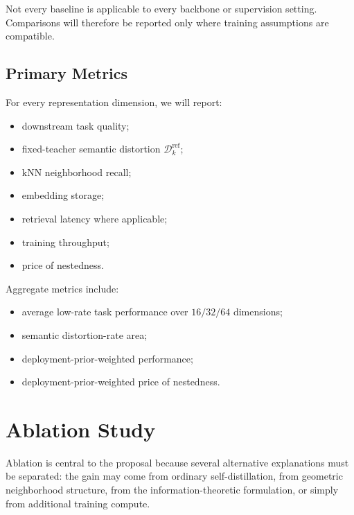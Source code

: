 \documentclass[11pt]{article}
\newcommand{\cD}{\mathcal{D}}
\begin{document}
Not every baseline is applicable to every backbone or supervision setting.
Comparisons will therefore be reported only where training assumptions are compatible.


\subsection{Primary Metrics}

For every representation dimension, we will report:

\begin{itemize}[leftmargin=1.5em]
    \item downstream task quality;
    \item fixed-teacher semantic distortion $\cD_k^{\mathrm{ref}}$;
    \item kNN neighborhood recall;
    \item embedding storage;
    \item retrieval latency where applicable;
    \item training throughput;
    \item price of nestedness.
\end{itemize}

Aggregate metrics include:
\begin{itemize}[leftmargin=1.5em]
    \item average low-rate task performance over $16/32/64$ dimensions;
    \item semantic distortion-rate area;
    \item deployment-prior-weighted performance;
    \item deployment-prior-weighted price of nestedness.
\end{itemize}


\section{Ablation Study}

Ablation is central to the proposal because several alternative explanations must be separated:
the gain may come from ordinary self-distillation, from geometric neighborhood structure, from the information-theoretic formulation, or simply from additional training compute.
\end{document}
